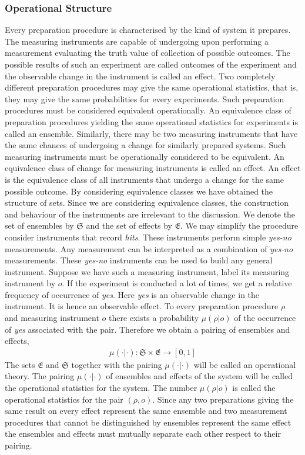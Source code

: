 \documentclass[11pt]{article}
\begin{document}
\subsubsection*{Operational Structure}\label{sec:gpt}
Every preparation procedure is characterised by the kind of system it prepares. The measuring instruments are capable of undergoing upon performing a measurement evaluating the truth value of collection of possible outcomes. The possible results of such an experiment are called outcomes of the experiment and the observable change in the instrument is called an effect. Two completely different preparation procedures may give the same operational statistics, that is, they may give the same probabilities for every experiments. Such preparation procedures must be considered equivalent operationally. An equivalence class of preparation procedures yielding the same operational statistics for experiments is called an ensemble. Similarly, there may be two measuring instruments that have the same chances of undergoing a change for similarly prepared systems. Such measuring instruments must be operationally considered to be equivalent. An equivalence class of change for measuring instruments is called an effect. An effect is the equivalence class of all instruments that undergo a change for the same possible outcome. By considering equivalence classes we have obtained the structure of sets. Since we are considering equivalence classes, the construction and behaviour of the instruments are irrelevant to the discussion. We denote the set of ensembles by $\mathfrak{S}$ and the set of effects by $\mathfrak{E}$. We may simplify the procedure consider instruments that record \emph{hits}. These instruments perform simple \emph{yes-no} measurements. Any measurement can be interpreted as a combination of \emph{yes-no} measurements. These \emph{yes-no} instruments can be used to build any general instrument. Suppose we have such a measuring instrument, label its measuring instrument by $o$. If the experiment is conducted a lot of times, we get a relative frequency of occurrence of \emph{yes}. Here \emph{yes} is an observable change in the instrument. It is hence an observable effect. To every preparation procedure $\rho$ and measuring instrument $o$ there exists a probability $\mu(\rho| o)$ of the occurrence of \emph{yes} associated with the pair. Therefore we obtain a pairing of ensembles and effects,
\begin{align*}
\mu(\cdot|\cdot):\mathfrak{S}\times \mathfrak{E}\longrightarrow[0,1]
\end{align*}
The sets $\mathfrak{E}$ and $\mathfrak{S}$ together with the pairing $\mu(\cdot|\cdot)$ will be called an operational theory. The pairing $\mu(\cdot|\cdot)$ of ensembles and effects of the system will be called the operational statistics for the system. The number $\mu(\rho|o)$ is called the operational statistics for the pair $(\rho,o)$. Since any two preparations giving the same result on every effect represent the same ensemble and two measurement procedures that cannot be distinguished by ensembles represent the same effect the ensembles and effects must mutually separate each other respect to their pairing.
\end{document}

